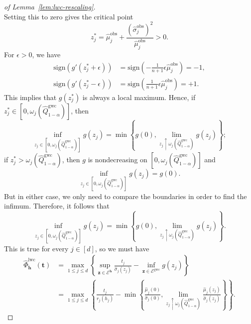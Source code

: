 \begin{proof}[of Lemma~\ref{lem:lwc-rescaling}]
\[\]
Setting this to zero gives the critical point
\[
z^\ast_j = \hat{\mu}^\mathrm{obs}_j + \frac{(\hat{\sigma}^\mathrm{obs}_j)^2}{\hat{\mu}^\mathrm{obs}_j}> 0.
\]
For $\epsilon>0$, we have
\begin{align*}
    \mathrm{sign}(g'(z^*_j+\epsilon)) &= \mathrm{sign}\left(-\tfrac{1}{n+1}\epsilon\hat{\mu}^\mathrm{obs}_j\right) = -1,\\
    \mathrm{sign}(g'(z^*_j-\epsilon)) &= \mathrm{sign}\left(\tfrac{1}{n+1}\epsilon\hat{\mu}^\mathrm{obs}_j\right) = +1.
\end{align*}
This implies that $g(z^*_j)$ is always a local maximum. Hence, if $z^*_j \in [0, \omega_j(\hat{Q}^{\mathrm{gwc}}_{1-\alpha})]$, then 
\[
\inf_{z_j \in [0, \omega_j(\hat{Q}^{\mathrm{gwc}}_{1-\alpha})]}g(z_j) = \min\left\{g(0), \lim_{z_j \uparrow \omega_j(\hat{Q}^{\mathrm{gwc}}_{1-\alpha})}g(z_j)\right\};
\]
if $z^*_j > \omega_j(\hat{Q}^{\mathrm{gwc}}_{1-\alpha})$, then $g$ is nondecreasing on $[0, \omega_j(\hat{Q}^{\mathrm{gwc}}_{1-\alpha})]$ and 
\[
\inf_{z_j \in [0, \omega_j(\hat{Q}^{\mathrm{gwc}}_{1-\alpha})]}g(z_j) = g(0).
\]
But in either case, we only need to compare the boundaries in order to find the infimum. Therefore, it follows that
\[
\inf_{z_j \in [0, \omega_j(\hat{Q}^{\mathrm{gwc}}_{1-\alpha})]}g(z_j) = \min\left\{g(0), \lim_{z_j \uparrow \omega_j(\hat{Q}^{\mathrm{gwc}}_{1-\alpha})}g(z_j)\right\}.
\]
This is true for every $j \in [d]$, so we must have
\begin{align*}
  \hat{\Phi}^{\mathrm{lwc}}_{\mathbf{h}}(\mathbf t)
  &=\max_{1\leq j\leq d}\left\{\sup_{\mathbf z \in \mathcal{E}^{\mathbf{h}}} \frac{t_j}{\hat{\sigma}_{j}(z_j)}-\inf_{\mathbf z \in \mathcal{E}^{\mathrm{gwc}}}g(z_j)\right\}\\
  & = \max_{1 \le j \le d}
\left\{\frac{t_j}{r_j(h_j)}-\min\left\{\frac{\hat{\mu}_{j}(0)}{\hat{\sigma}_{j}(0)}, \lim_{z_j \uparrow \omega_j(\hat{Q}^{\mathrm{gwc}}_{1-\alpha})}\frac{\hat{\mu}_{j}(z_j)}{\hat{\sigma}_{j}(z_j)}\right\}\right\}.
\end{align*}
\end{proof}

